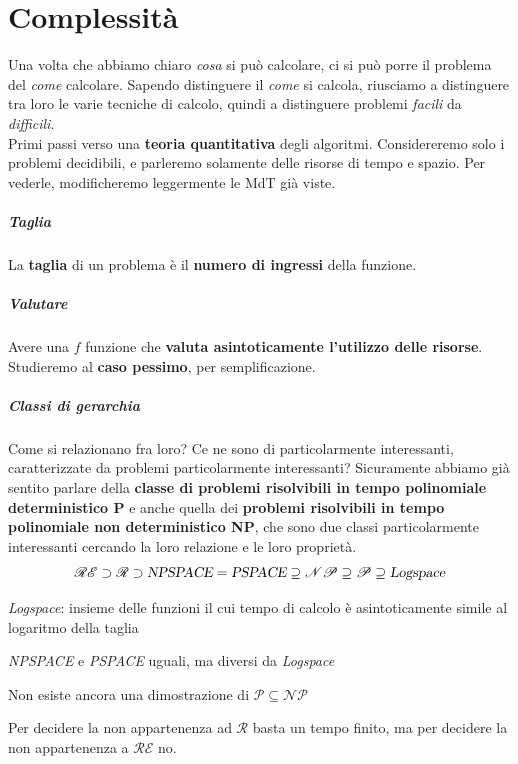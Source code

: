 \documentclass[10pt]{book}
\begin{document}
\chapter{Complessità}
Una volta che abbiamo chiaro \textit{cosa} si può calcolare, ci si può porre il problema del \textit{come} calcolare. Sapendo distinguere il \textit{come} si calcola, riusciamo a distinguere tra loro le varie tecniche di calcolo, quindi a distinguere problemi \textit{facili} da \textit{difficili}.\\
Primi passi verso una \textbf{teoria quantitativa} degli algoritmi. Considereremo solo i problemi decidibili, e parleremo solamente delle risorse di tempo e spazio. Per vederle, modificheremo leggermente le MdT già viste.
\paragraph{Taglia} La \textbf{taglia} di un problema è il \textbf{numero di ingressi} della funzione.
\paragraph{Valutare} Avere una $f$ funzione che \textbf{valuta asintoticamente l'utilizzo delle risorse}. Studieremo al \textbf{caso pessimo}, per semplificazione.
\paragraph{Classi di gerarchia} Come si relazionano fra loro? Ce ne sono di particolarmente interessanti, caratterizzate da problemi particolarmente interessanti? Sicuramente abbiamo già sentito parlare della \textbf{classe di problemi risolvibili in tempo polinomiale deterministico P} e anche quella dei  \textbf{problemi risolvibili in tempo polinomiale non deterministico NP}, che sono due classi particolarmente interessanti cercando la loro relazione e le loro proprietà.
$$\mathscr{RE} \supset \mathscr{R} \supset \textsl{NPSPACE} = \textsl{PSPACE} \supseteq \mathscr{NP} \supseteq \mathscr{P} \supseteq \textsl{Logspace}$$
\begin{list}{}{Considerando}
	\item \textsl{Logspace}: insieme delle funzioni il cui tempo di calcolo è asintoticamente simile al logaritmo della taglia
	\item \textsl{NPSPACE} e \textsl{PSPACE} uguali, ma diversi da \textsl{Logspace}
	\item Non esiste ancora una dimostrazione di $\mathscr{P} \subseteq \mathscr{NP}$
	\item Per decidere la non appartenenza ad $\mathscr{R}$ basta un tempo finito, ma per decidere la non appartenenza a $\mathscr{RE}$ no.
\end{list}
\end{document}
